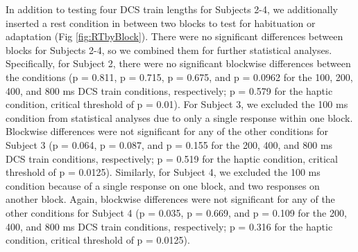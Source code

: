 In addition to testing four DCS train lengths for Subjects 2-4, we additionally inserted a rest condition in between two blocks to test for habituation or adaptation (Fig \ref{fig:RTbyBlock}). There were no significant differences between blocks for Subjects 2-4, so we combined them for further statistical analyses. Specifically, for Subject 2, there were no significant blockwise differences between the conditions (p = 0.811, p = 0.715, p = 0.675, and p = 0.0962 for the 100, 200, 400, and 800 ms DCS train conditions, respectively; p = 0.579 for the haptic condition, critical threshold of p = 0.01). For Subject 3, we excluded the 100 ms condition from statistical analyses due to only a single response within one block. Blockwise differences were not significant for any of the other conditions for Subject 3 (p = 0.064, p = 0.087, and p = 0.155 for the 200, 400, and 800 ms DCS train conditions, respectively; p = 0.519 for the haptic condition, critical threshold of p = 0.0125). Similarly, for Subject 4, we excluded the 100 ms condition because of a single response on one block, and two responses on another block. Again, blockwise differences were not significant for any of the other conditions for Subject 4 (p = 0.035, p = 0.669, and p = 0.109 for the 200, 400, and 800 ms DCS train conditions, respectively; p = 0.316 for the haptic condition, critical threshold of p = 0.0125).

